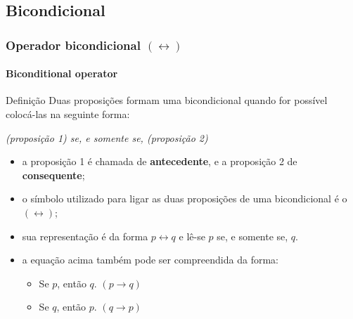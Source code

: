 \documentclass[10pt, headsepline, captions=tableabove, xcolor=table]{beamer}
\begin{document}
\subsection{Bicondicional}
%
\begin{frame}[t]
    \frametitle{Operador bicondicional $(\leftrightarrow)$ }
    \framesubtitle{Biconditional operator}
    \begin{block}{Definição}
        Duas proposições formam uma bicondicional quando for possível colocá-las na seguinte forma: \\[2pt]
        \begin{center}
            \textit{(proposição 1) se, e somente se, (proposição 2)}
        \end{center}
        \begin{itemize}
            \item a proposição 1 é chamada de \textbf{antecedente}, e a proposição 2 de \textbf{consequente};
            \item o símbolo utilizado para ligar as duas proposições de uma bicondicional é o $(\leftrightarrow)$;
            \item sua representação é da forma $p \leftrightarrow q$ e lê-se $p$ se, e somente se, $q$.
            \item a equação acima também pode ser compreendida da forma:
            \begin{itemize}
                \item[\ding{114}] Se $p$, então $q$. $(p \rightarrow q)$
                \item[\ding{114}] Se $q$, então $p$. $(q \rightarrow p)$
            \end{itemize}
        \end{itemize}
    \end{block}
\end{frame}
%
\end{document}
